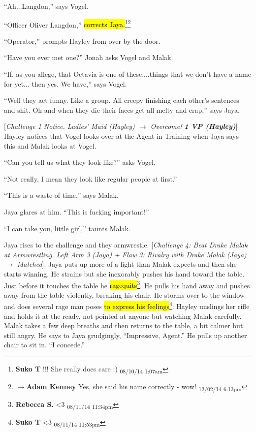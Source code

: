``Ah...Langdon,'' says Vogel.

``Officer Oliver Langdon,'' \hl{corrects Jaya.}\footnote{\textbf{Suko T }!!!  She really does care :) \textsubscript{08/10/14 1:07am}}\footnote{$\rightarrow$\textbf{Adam Kenney }Yes, she said his name correctly - wow! \textsubscript{12/02/14 6:13pm}}

``Operator,'' prompts Hayley from over by the door.

``Have you ever met one?'' Jonah asks Vogel and Malak.

``If, as you allege, that Octavia is one of these....things that we don't have a name for yet... then yes.  We have,'' says Vogel.

``Well they act funny.  Like a group.   All creepy finishing each other's sentences and shit.  Oh and when they die their faces get all melty and crap,'' says Jaya.

{[}\textit{Challenge 1 Notice.  Ladies' Maid (Hayley) $\rightarrow$ Overcome! }\textit{\textbf{1 VP (Hayley)}}{]}  Hayley notices that Vogel looks over at the Agent in Training when Jaya says this and Malak looks at Vogel.

``Can you tell us what they look like?'' asks Vogel.

``Not really, I mean they look like regular people at first.''

``This is a waste of time,'' says Malak.

Jaya glares at him.  ``This is fucking important!''

``I can take you, little girl,'' taunts Malak.



Jaya rises to the challenge and they armwrestle.  {[}\textit{Challenge 4: Beat Drake Malak at Armwrestling.  Left Arm 3 (Jaya) + Flaw 3: Rivalry with Drake Malak (Jaya) $\rightarrow$ Matched}{]}.  Jaya puts up more of a fight than Malak expects and then she starts winning. He strains but she inexorably pushes his hand toward the table. Just before it touches the table he \hl{ragequits}\footnote{\textbf{Rebecca S. }\textless 3 \textsubscript{08/11/14 11:34pm}}.  He pulls his hand away and pushes away from the table violently, breaking his chair.  He storms over to the window and does several rage man poses \hl{to express his feelings}\footnote{\textbf{Suko T }\textless 3 \textsubscript{08/11/14 11:53pm}}.  Hayley unslings her rifle and holds it at the ready, not pointed at anyone but watching Malak carefully.  Malak takes a few deep breaths and then returns to the table, a bit calmer but still angry.  He says to Jaya grudgingly, ``Impressive, Agent.''  He pulls up another chair to sit in.   ``I concede.''

